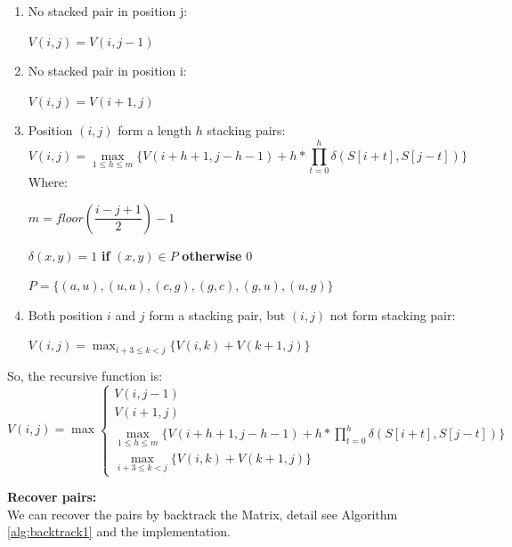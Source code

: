 \documentclass[10pt]{article}
\begin{document}
\begin{enumerate}  
    \item No stacked pair in position j:
    \begin{center} $V(i,j)=V(i,j-1)$ \end{center}
    \item No stacked pair in position i:
    \begin{center} $V(i,j)=V(i+1,j)$ \end{center}
    \item Position $(i,j)$ form a length $h$ stacking pairs:
    \begin{equation}
    \label{eq:max_stack_case3}
    V(i,j)=\max_{1 \leq h \leq m }{
        \{ V(i+h+1,j-h-1)+ h* \prod_{t=0}^{h} \delta(S[i+t], S[j-t]) \}
    }
    \end{equation}
    Where:
    \begin{center} $m = floor(\dfrac{i-j+1}{2})-1$ \end{center}
    \begin{center} $\delta(x,y)=1$ \textbf{if} $(x,y) \in P$ \textbf{otherwise} $0$ \end{center}
    \begin{center} $P = \{(a,u),(u,a),(c,g),(g,c),(g,u),(u,g)\}$ \end{center}
    \item Both position $i$ and $j$ form a stacking pair, but $(i,j)$ not form stacking pair:
    \begin{center} $V(i,j) = \displaystyle\max_{i+3\leq k<j}\{V(i,k) + V(k+1,j)\}$ \end{center}
\end{enumerate}

So, the recursive function is:
\begin{equation}
    V(i,j)=\max\begin{cases}
        V(i,j-1) \\
        V(i+1,j) \\
        \displaystyle\max_{1 \leq h \leq m }{ \{ V(i+h+1,j-h-1)+ h* \prod_{t=0}^{h} \delta(S[i+t], S[j-t]) \}} \\
        \displaystyle\max_{i+3\leq k<j}\{V(i,k) + V(k+1,j)\}
    \end{cases}
\end{equation}

\noindent
\textbf{Recover pairs:} \\

We can recover the pairs by backtrack the Matrix, detail see Algorithm \ref{alg:backtrack1} and the implementation.
\end{document}
